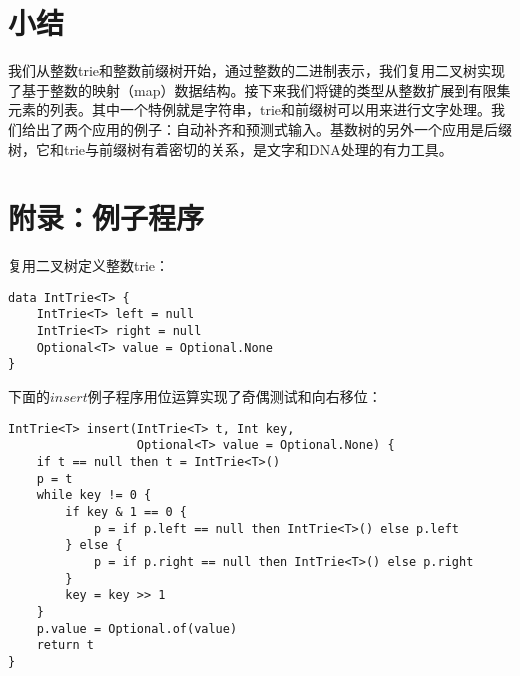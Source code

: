 \documentclass[b5paper]{ctexart}
\begin{document}
\begin{Exercise}
\end{Exercise}

\section{小结}
我们从整数trie和整数前缀树开始，通过整数的二进制表示，我们复用二叉树实现了基于整数的映射（map）数据结构。接下来我们将键的类型从整数扩展到有限集元素的列表。其中一个特例就是字符串，trie和前缀树可以用来进行文字处理。我们给出了两个应用的例子：自动补齐和预测式输入。基数树的另外一个应用是后缀树，它和trie与前缀树有着密切的关系，是文字和DNA处理的有力工具。

\section{附录：例子程序}

复用二叉树定义整数trie：

\begin{lstlisting}[language = Bourbaki]
data IntTrie<T> {
    IntTrie<T> left = null
    IntTrie<T> right = null
    Optional<T> value = Optional.None
}
\end{lstlisting}

下面的$insert$例子程序用位运算实现了奇偶测试和向右移位：

\begin{lstlisting}[language = Bourbaki]
IntTrie<T> insert(IntTrie<T> t, Int key,
                  Optional<T> value = Optional.None) {
    if t == null then t = IntTrie<T>()
    p = t
    while key != 0 {
        if key & 1 == 0 {
            p = if p.left == null then IntTrie<T>() else p.left
        } else {
            p = if p.right == null then IntTrie<T>() else p.right
        }
        key = key >> 1
    }
    p.value = Optional.of(value)
    return t
}
\end{lstlisting}


\end{document}
